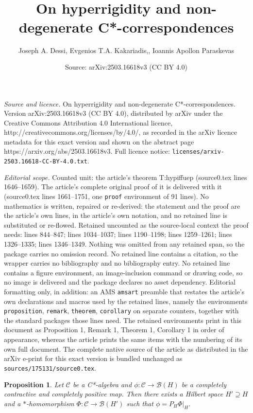 \documentclass[10pt,a4paper]{amsart}
\title{On hyperrigidity and non-degenerate C*-correspondences}
\author{Joseph A. Dessi, Evgenios T.A. Kakariadis,, Ioannis Apollon Paraskevas}
\date{Source: arXiv:2503.16618v3 (CC BY 4.0)}
\newtheorem{proposition}{Proposition}
\newcommand{\B}{{\mathcal{B}}}
\newcommand{\C}{{\mathcal{C}}}
\begin{document}
\maketitle

\noindent\emph{Source and licence.} On hyperrigidity and non-degenerate C*-correspondences. Version arXiv:2503.16618v3 (CC BY 4.0), distributed by arXiv under the Creative Commons Attribution 4.0 International licence, http://creativecommons.org/licenses/by/4.0/, as recorded in the arXiv licence metadata for this exact version and shown on the abstract page https://arxiv.org/abs/2503.16618v3. Full licence notice: \texttt{licenses/arxiv-2503.16618-CC-BY-4.0.txt}.\par\smallskip

\noindent\textit{Editorial scope.} Counted unit: the article's theorem T:hypiffuep (source0.tex lines 1646--1659). The article's complete original proof of it is delivered with it (source0.tex lines 1661--1751, one \texttt{proof} environment of 91 lines). No mathematics is written, repaired or re-derived: the statement and the proof are the article's own lines, in the article's own notation, and no retained line is substituted or re-flowed.  Retained uncounted as the source-local context the proof needs: lines 844--847; lines 1034--1037; lines 1190--1198; lines 1259--1261; lines 1326--1335; lines 1346--1349.  Nothing was omitted from any retained span, so the package carries no omission record.  No retained line contains a citation, so the wrapper carries no bibliography and no bibliography entry.  No retained line contains a figure environment, an image-inclusion command or drawing code, so no image is delivered and the package declares no asset dependency.  Editorial formatting only, in addition: an AMS \texttt{amsart} preamble that restates the article's own declarations and macros used by the retained lines, namely the environments \texttt{proposition}, \texttt{remark}, \texttt{theorem}, \texttt{corollary} on separate counters, together with the standard packages those lines need.  The retained environments print in this document as Proposition 1, Remark 1, Theorem 1, Corollary 1 in order of appearance, whereas the article prints the same items with the numbering of its own full document.  The complete native source of the article as distributed in the arXiv e-print for this exact version is bundled unchanged as \texttt{sources/175131/source0.tex}.
\begin{proposition}\label{P:Dil}
Let $\C$ be a C*-algebra and $\phi \colon \C \to \B(H)$ be a completely contractive and completely positive map.
Then there exists a Hilbert space $H' \supseteq H$ and a $*$-homomorphism $\Phi \colon \C \to \B(H')$ such that $\phi = P_H \Phi |_H$.
\end{proposition}
\end{document}
